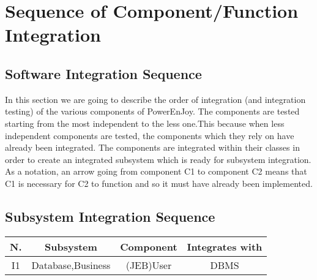 \section{Sequence of Component/Function Integration}
\subsection{Software Integration Sequence}
In this section we are going to describe the order of integration (and integration
testing) of the various components of PowerEnJoy.
The components are tested starting from the most independent to the less
one.This because when less independent components are tested, the components which
they rely on have already been integrated. The components are integrated
within their classes in order to create an integrated subsystem which is ready
for subsystem integration.
As a notation, an arrow going from component C1 to component C2 means that C1 is necessary for C2 to function and so it must have already been implemented.

\subsection{Subsystem Integration Sequence}
\begin{tabular}{|c|c|c|c|}
\hline
\textbf{N.} & \textbf{Subsystem} & \textbf{Component} & \textbf{Integrates with}\\
\hline
\rule[-1cm]{0mm}{1cm}
I1 & Database,Business & (JEB)User & DBMS\\
\end{tabular}


